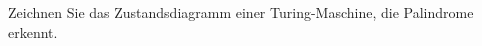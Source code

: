 Zeichnen Sie das Zustandsdiagramm einer Turing-Maschine,
die Palindrome erkennt.

\begin{loesung}
\end{loesung}

